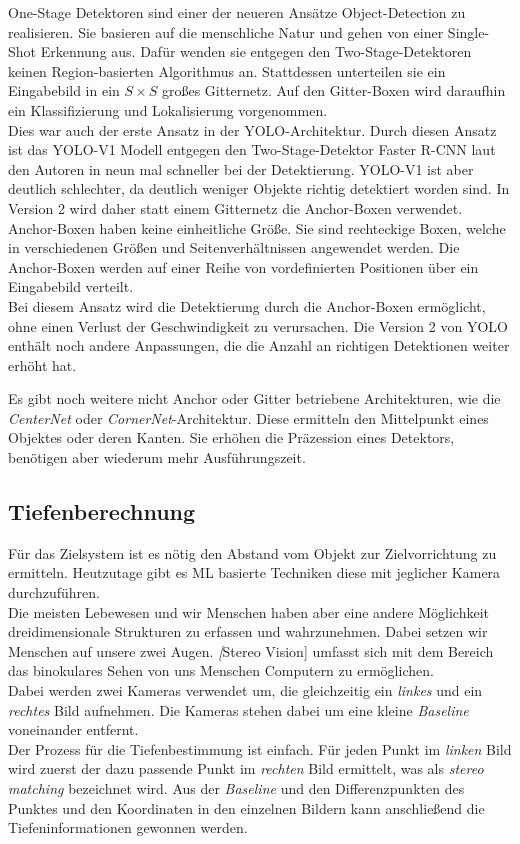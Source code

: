 One-Stage Detektoren sind einer der neueren Ansätze Object-Detection zu realisieren.
Sie basieren auf die menschliche Natur und gehen von einer Single-Shot Erkennung aus. Dafür wenden sie entgegen den Two-Stage-Detektoren keinen Region-basierten Algorithmus an.
Stattdessen unterteilen sie ein Eingabebild in ein $S \times  S$ großes Gitternetz. Auf den Gitter-Boxen wird daraufhin ein Klassifizierung und Lokalisierung vorgenommen.\\
Dies war auch der erste Ansatz in der \ac{YOLO}-Architektur. Durch diesen Ansatz ist das \ac{YOLO}-V1 Modell entgegen den Two-Stage-Detektor Faster \ac{R-CNN} laut den Autoren in \cite{YOLO_V3} neun mal schneller bei der Detektierung. \ac{YOLO}-V1 ist aber deutlich schlechter, da deutlich weniger Objekte richtig detektiert worden sind. In Version 2 wird daher statt einem Gitternetz die Anchor-Boxen verwendet. Anchor-Boxen haben keine einheitliche Größe. Sie sind rechteckige Boxen, welche in verschiedenen Größen und Seitenverhältnissen angewendet werden. Die Anchor-Boxen werden auf einer Reihe von vordefinierten Positionen über ein Eingabebild verteilt.\\
Bei diesem Ansatz wird die Detektierung durch die Anchor-Boxen ermöglicht, ohne einen Verlust der Geschwindigkeit zu verursachen. Die Version 2 von \ac{YOLO} enthält noch andere Anpassungen, die die Anzahl an richtigen Detektionen weiter erhöht hat.
\cite{YOLO_V3}

Es gibt noch weitere nicht Anchor oder Gitter betriebene Architekturen, wie die \textit{CenterNet} oder \textit{CornerNet}-Architektur. Diese ermitteln den Mittelpunkt eines Objektes oder deren Kanten. Sie erhöhen die Präzession eines Detektors, benötigen aber wiederum mehr Ausführungszeit.\cite{yolo_all}

\subsection{Tiefenberechnung}

Für das Zielsystem ist es nötig den Abstand vom Objekt zur Zielvorrichtung zu ermitteln. Heutzutage gibt es \ac{ML} basierte Techniken diese mit jeglicher Kamera durchzuführen.\\
Die meisten Lebewesen und wir Menschen haben aber eine andere Möglichkeit dreidimensionale Strukturen zu erfassen und wahrzunehmen. Dabei setzen wir Menschen auf unsere zwei Augen. \textit[Stereo Vision] umfasst sich mit dem Bereich das binokulares Sehen von uns Menschen Computern zu ermöglichen.\\
Dabei werden zwei Kameras verwendet um, die gleichzeitig ein \textit{linkes} und ein \textit{rechtes} Bild aufnehmen. Die Kameras stehen dabei um eine kleine \textit{Baseline} voneinander entfernt.\\
Der Prozess für die Tiefenbestimmung ist einfach. Für jeden Punkt im \textit{linken} Bild wird zuerst der dazu passende Punkt im \textit{rechten} Bild ermittelt, was als \textit{stereo matching} bezeichnet wird. Aus der \textit{Baseline} und den Differenzpunkten des Punktes und den Koordinaten in den einzelnen Bildern kann anschließend die Tiefeninformationen gewonnen werden.
\cite{stereo_vision}

